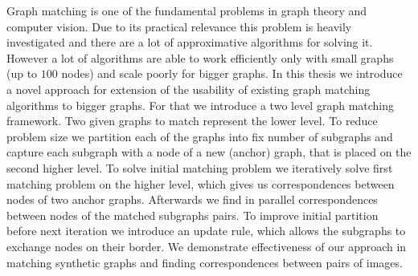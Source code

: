 Graph matching is one of the fundamental problems in graph theory and computer vision. Due to its practical relevance this problem is heavily investigated and there are a lot of approximative algorithms for solving it.
However a lot of algorithms are able to work efficiently only with small graphs (up to $100$ nodes) and scale poorly for bigger graphs. In this thesis we introduce a novel approach for extension of the usability of existing graph matching algorithms to bigger graphs. For that we introduce a two level graph matching framework. Two given graphs to match represent the lower level. To reduce problem size we partition each of the graphs into fix number of subgraphs and capture each subgraph with a node of a new (anchor) graph, that is placed on the second higher level. To solve initial matching problem we iteratively solve first matching problem on the higher level, which gives us correspondences between nodes of two anchor graphs. Afterwards we find in parallel correspondences between nodes of the matched subgraphs pairs. To improve initial partition before next iteration we introduce an update rule, which allows the subgraphs to exchange nodes on their border. We demonstrate effectiveness of our approach in matching synthetic graphs and finding correspondences between pairs of images.
